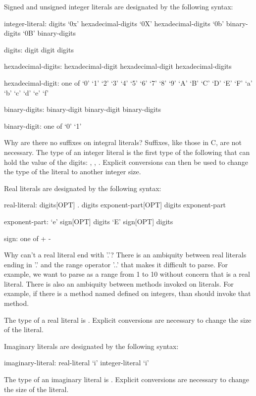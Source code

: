 Signed and unsigned integer literals are designated by the following
syntax:
\begin{syntax}
integer-literal:
  digits
  `0x' hexadecimal-digits
  `0X' hexadecimal-digits
  `0b' binary-digits
  `0B' binary-digits

digits:
  digit
  digit digits

hexadecimal-digits:
  hexadecimal-digit
  hexadecimal-digit hexadecimal-digits

hexadecimal-digit: one of
  `0' `1' `2' `3' `4' `5' `6' `7' `8' `9' `A' `B' `C' `D' `E' `F' `a' `b' `c' `d' `e' `f'

binary-digits:
  binary-digit
  binary-digit binary-digits

binary-digit: one of
  `0' `1'
\end{syntax}

\begin{rationale}
Why are there no suffixes on integral literals?  Suffixes, like those
in C, are not necessary.  The type of an integer literal is the first
type of the following that can hold the value of the
digits: , , .  Explicit
conversions can then be used to change the type of the literal to
another integer size.
\end{rationale}

Real literals are designated by the following syntax:
\begin{syntax}
real-literal:
  digits[OPT] . digits exponent-part[OPT]
  digits exponent-part

exponent-part:
  `e' sign[OPT] digits
  `E' sign[OPT] digits

sign: one of
  + -
\end{syntax}
\begin{rationale}
Why can't a real literal end with '.'?  There is an ambiquity between
real literals ending in '.' and the range operator '..' that makes it
difficult to parse.  For example, we want to parse  as a
range from 1 to 10 without concern that  is a real literal.
There is also an ambiquity between methods invoked on literals.  For
example, if there is a method named  defined on integers,
than  should invoke that method.
\end{rationale}
The type of a real literal is .  Explicit conversions are
necessary to change the size of the literal.

Imaginary literals are designated by the following syntax:
\begin{syntax}
imaginary-literal:
  real-literal `i'
  integer-literal `i'
\end{syntax}
The type of an imaginary literal is .  Explicit conversions
are necessary to change the size of the literal.

